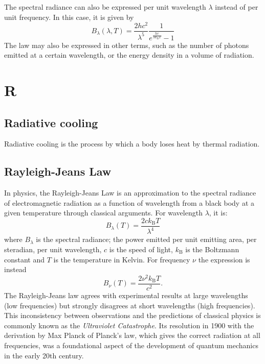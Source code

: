 \documentclass[11pt]{article}
\begin{document}
    The spectral radiance can also be expressed per unit wavelength
    $\lambda$ instead of per unit frequency.  In this case, it is given by
    \begin{equation}
      B_{\lambda }(\lambda ,T)={\frac {2hc^{2}}{\lambda ^{5}}}{\frac {1}{e^{\frac {hc}{\lambda k_{\mathrm {B} }T}}-1}} 
    \end{equation}
    The law may also be expressed in other terms, such as the number
of photons emitted at a certain wavelength, or the energy density in a
volume of radiation.


\section*{R}

\subsection*{Radiative cooling}
Radiative cooling is the process by which a body loses heat by thermal radiation.

\subsection*{Rayleigh-Jeans Law}
In physics, the Rayleigh-Jeans Law is an approximation to the spectral
radiance of electromagnetic radiation as a function of wavelength from
a black body at a given temperature through classical arguments. For
wavelength $\lambda$, it is:
\begin{equation}
B_{\lambda }(T)={\frac {2ck_{\mathrm {B} }T}{\lambda ^{4}}} 
\end{equation}
where $B_{\lambda }$ is the spectral radiance; the power emitted per
unit emitting area, per steradian, per unit wavelength, $c$ is the speed of light, 
$k_{\mathrm {B}}$ is the Boltzmann constant and $T$ is 
the temperature in Kelvin. For frequency $\nu$
the expression is instead
\begin{equation}
B_{\nu }(T)={\frac {2\nu ^{2}k_{\mathrm {B} }T}{c^{2}}}.
\end{equation}
The Rayleigh-Jeans law agrees with experimental results at large
wavelengths (low frequencies) but strongly disagrees at short
wavelengths (high frequencies). This inconsistency between
observations and the predictions of classical physics is commonly
known as the {\it Ultraviolet Catastrophe}. Its resolution in 1900
with the derivation by Max Planck of Planck's law, which gives the
correct radiation at all frequencies, was a foundational aspect of the
development of quantum mechanics in the early 20th century.
\end{document}
